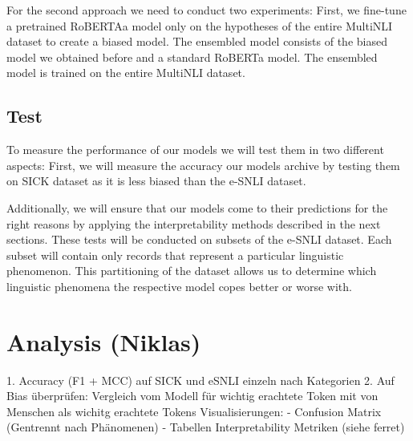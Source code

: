 \documentclass[12pt,a4paper]{article}
\begin{document}
For the second approach we need to conduct two experiments: First, we fine-tune a pretrained RoBERTAa model only on the hypotheses of the entire MultiNLI dataset to create a biased model. The ensembled model consists of the biased model we obtained before and a standard RoBERTa model. The ensembled model is trained on the entire MultiNLI dataset.

\subsection{Test}
To measure the performance of our models we will test them in two different aspects: First, we will measure the accuracy our models archive by testing them on SICK dataset as it is less biased than the e-SNLI dataset.

Additionally, we will ensure that our models come to their predictions for the right reasons by applying the interpretability methods described in the next sections. These tests will be conducted on subsets of the e-SNLI dataset. Each subset will contain only records that represent a particular linguistic phenomenon. This partitioning of the dataset allows us to determine which linguistic phenomena the respective model copes better or worse with.

\section{Analysis (Niklas)}
1. Accuracy (F1 + MCC) auf SICK und eSNLI einzeln nach Kategorien
2. Auf Bias überprüfen: Vergleich vom Modell für wichtig erachtete Token mit von Menschen als wichitg erachtete Tokens
Visualisierungen:
- Confusion Matrix (Gentrennt nach Phänomenen)
- Tabellen Interpretability Metriken (siehe ferret)


\printbibliography
\end{document}
